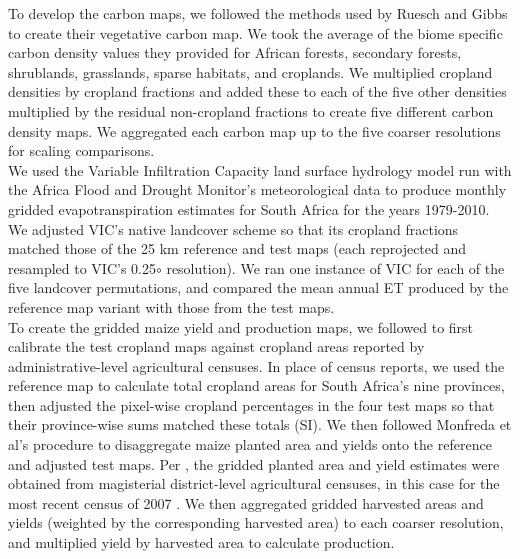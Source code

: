 \documentclass{pnastwo}
\begin{document}
\begin{article}
\begin{materials}
\indent To develop the carbon maps, we followed the methods used by Ruesch and Gibbs \cite{ruesch_new_2008} to create their vegetative carbon map. We took the average of the biome specific carbon density values they provided for African forests, secondary forests, shrublands, grasslands, sparse habitats, and croplands. We multiplied cropland densities by cropland fractions and added these to each of the five other densities multiplied by the residual non-cropland fractions to create five different carbon density maps. We aggregated each carbon map up to the five coarser resolutions for scaling comparisons.  \\
\indent We used the Variable Infiltration Capacity \cite{liang_simple_1994} land surface hydrology model run with the Africa Flood and Drought Monitor's meteorological data \cite{sheffield_drought_2013} to produce monthly gridded evapotranspiration estimates for South Africa for the years 1979-2010. We adjusted VIC's native landcover scheme so that its cropland fractions matched those of the 25 km reference and test maps (each reprojected and resampled to VIC's 0.25${\circ}$ resolution). We ran one instance of VIC for each of the five landcover permutations, and compared the mean annual ET produced by the reference map variant with those from the test maps. \\
\indent To create the gridded maize yield and production maps, we followed \cite{ramankutty_farming_2008} to first calibrate the test cropland maps against cropland areas reported by administrative-level agricultural censuses. In place of census reports, we used the reference map to calculate total cropland areas for South Africa's nine provinces, then adjusted the pixel-wise cropland percentages in the four test maps so that their province-wise sums matched these totals (SI). We then followed Monfreda et al's procedure \cite{monfreda_farming_2008} to disaggregate maize \cite[South Africa's largest crop][]{estes_comparing_2013} planted area and yields onto the reference and adjusted test maps. Per \cite{monfreda_farming_2008}, the gridded planted area and yield estimates were obtained from magisterial district-level agricultural censuses, in this case for the most recent census of 2007 \cite{statistics_south_africa_commercial_2007}. We then aggregated gridded harvested areas and yields (weighted by the corresponding harvested area) to each coarser resolution, and multiplied yield by harvested area to calculate production.\\

\end{materials}
\end{article}
\end{document}
